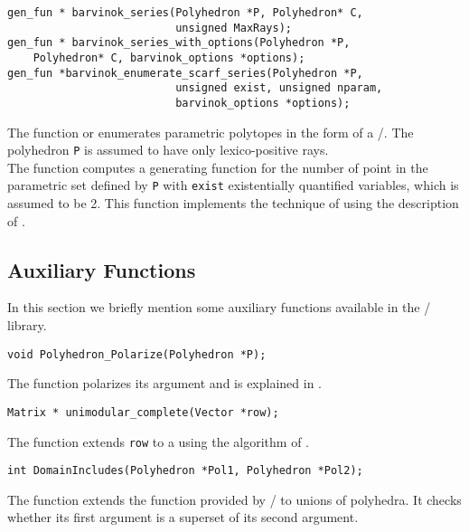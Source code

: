 \begin{verbatim}
gen_fun * barvinok_series(Polyhedron *P, Polyhedron* C, 
                          unsigned MaxRays);
gen_fun * barvinok_series_with_options(Polyhedron *P,
    Polyhedron* C, barvinok_options *options);
gen_fun *barvinok_enumerate_scarf_series(Polyhedron *P,
                          unsigned exist, unsigned nparam,
                          barvinok_options *options);
\end{verbatim}
The function 
 or
 enumerates parametric polytopes
in the form of a \rgf/.
The polyhedron \verb+P+ is assumed to have only
lexico-positive rays.
\\
The function  computes a
generating function for the number of point in the parametric set
defined by \verb+P+ with \verb+exist+ existentially quantified
variables, which is assumed to be 2.
This function implements the technique of
 using the 
description of .

\subsection{Auxiliary Functions}

In this section we briefly mention some auxiliary functions
available in the \barvinok/ library.

\begin{verbatim}
void Polyhedron_Polarize(Polyhedron *P);
\end{verbatim}
The function  
polarizes its argument and is explained
in .

\begin{verbatim}
Matrix * unimodular_complete(Vector *row);
\end{verbatim}
The function  extends
\verb+row+ to a  using the
algorithm of .

\begin{verbatim}
int DomainIncludes(Polyhedron *Pol1, Polyhedron *Pol2);
\end{verbatim}
The function  extends
the function 
provided by \PolyLib/ 
to unions of polyhedra.
It checks whether its first argument is a superset of
its second argument.

